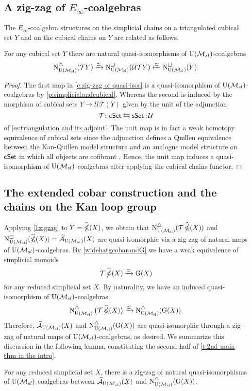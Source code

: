 \subsection{A zig-zag of $E_\infty$-coalgebras}
The $E_{\infty}$-coalgebra structures on the simplicial chains on a triangulated cubical set $Y$ and on the cubical chains on $Y$ are related as follows.

\begin{lemma} \label{l:zigzag}
	For any cubical set $Y$ there are natural quasi-isomorphisms of ${\operatorname{U}(\mathcal{M}_{sl})}$-coalgebras
	\begin{equation} \label{e:zig-zag of quasi-isos}
	\operatorname{N^{\triangle}_{{\operatorname{U}(\mathcal{M}_{sl})}}}(\mathcal{T}Y) \xrightarrow{\simeq}
	\operatorname{N^{\square}_{{\operatorname{U}(\mathcal{M}_{sl})}}}(\mathcal{U}\mathcal{T}Y) \xleftarrow{\simeq}
	\operatorname{N^{\square}_{{\operatorname{U}(\mathcal{M}_{sl})}}}(Y).
	\end{equation}
\end{lemma}

\begin{proof}
	The first map in \eqref{e:zig-zag of quasi-isos} is a quasi-isomorphism of ${\operatorname{U}(\mathcal{M}_{sl})}$-coalgebras by \cref{p:simplicialandcubical}.
	Whereas the second is induced by the morphism of cubical sets $Y \to \mathcal{U} \mathcal{T} (Y)$ given by the unit of the adjunction
	\[
	\mathcal{T} \colon \mathsf{cSet} \leftrightarrows \mathsf{sSet} :\! \mathcal{U}
	\]
	of \cref{ss:triangulation and its adjoint}.
	The unit map is in fact a weak homotopy equivalence of cubical sets since the adjunction defines a Quillen equivalence between the Kan-Quillen model structure and an analogue model structure on $\mathsf{cSet}$ in which all objects are cofibrant \cite{cisinski2006presheaves}.
	Hence, the unit map induces a quasi-isomorphism of ${\operatorname{U}(\mathcal{M}_{sl})}$-coalgebras after applying the cubical chains functor.
\end{proof}

\subsection{The extended cobar construction and the chains on the Kan loop group}

Applying \cref{l:zigzag} to $Y = \operatorname{\widehat{\mathbb{\Omega}}}(X)$, we obtain that $\operatorname{N^{\triangle}_{{\operatorname{U}(\mathcal{M}_{sl})}}} (\mathcal{T} \operatorname{\widehat{\mathbb{\Omega}}}(X))$ and $\operatorname{N^{\square}_{{\operatorname{U}(\mathcal{M}_{sl})}}}(\operatorname{\widehat{\mathbb{\Omega}}}(X)) = \operatorname{\mathcal{\widehat{A}}}_{{\operatorname{U}(\mathcal{M}_{sl})}}(X)$ are quasi-isomorphic via a zig-zag of natural maps of ${\operatorname{U}(\mathcal{M}_{sl})}$-coalgebras.
By \cref{widehatgcobarandG} we have a weak equivalence of simplicial monoids
\[
\mathcal{T}\operatorname{\widehat{\mathbb{\Omega}}}(X) \xrightarrow{\simeq} \operatorname{G}(X)
\]
for any reduced simplicial set $X$.
By naturality, we have an induced quasi-isomorphism of ${\operatorname{U}(\mathcal{M}_{sl})}$-coalgebras
\[
\operatorname{N^{\triangle}_{{\operatorname{U}(\mathcal{M}_{sl})}}} \big( \mathcal{T} \operatorname{\widehat{\mathbb{\Omega}}}(X) \big) \xrightarrow{\simeq}
\operatorname{N^{\triangle}_{{\operatorname{U}(\mathcal{M}_{sl})}}} (\operatorname{G}(X)).
\]
Therefore, $\operatorname{\mathcal{\widehat{A}}}_{{\operatorname{U}(\mathcal{M}_{sl})}}(X)$ and $\operatorname{N^{\triangle}_{{\operatorname{U}(\mathcal{M}_{sl})}}}(\operatorname{G}(X))$ are quasi-isomorphic through a zig-zag of natural maps of ${\operatorname{U}(\mathcal{M}_{sl})}$-coalgebras, as desired.
We summarize this discussion in the following lemma, constituting the second half of \cref{t:2nd main thm in the intro}.

\begin{lemma}
	For any reduced simplicial set $X$, there is a zig-zag of natural quasi-isomorphisms of ${\operatorname{U}(\mathcal{M}_{sl})}$-coalgebras between $\operatorname{\mathcal{\widehat{A}}}_{\operatorname{U}(\mathcal{M}_{sl})}(X)$ and $\operatorname{N^{\triangle}_{{\operatorname{U}(\mathcal{M}_{sl})}}}(\operatorname{G}(X))$.
\end{lemma}